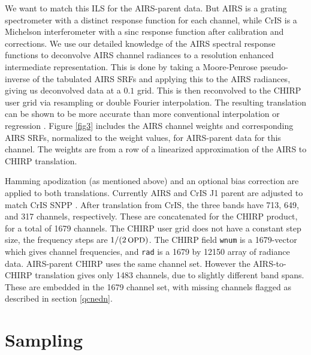 \documentclass[11pt]{article}
\begin{document}
We want to match this ILS for the AIRS-parent data.  But AIRS is a
grating spectrometer with a distinct response function for each
channel, while CrIS is a Michelson interferometer with a sinc
response function after calibration and corrections.  We use our
detailed knowledge of the AIRS spectral response functions to
deconvolve AIRS channel radiances to a resolution enhanced
intermediate representation.  This is done by taking a Moore-Penrose
pseudo-inverse of the tabulated AIRS SRFs and applying this to the
AIRS radiances, giving us deconvolved data at a $0.1$ {\wn} grid.
This is then reconvolved to the CHIRP user grid via resampling or
double Fourier interpolation.  The resulting translation can be
shown to be more accurate than more conventional interpolation or
regression \cite{mott2018}.  Figure \ref{fig3} includes the AIRS
channel weights and corresponding AIRS SRFs, normalized to the weight
values, for AIRS-parent data for this channel.  The weights are from
a row of a linearized approximation of the AIRS to CHIRP translation.

Hamming apodization (as mentioned above) and an optional bias
correction are applied to both translations.  Currently AIRS and
CrIS J1 parent are adjusted to match CrIS SNPP \cite{strow2021a}.
After translation from CrIS, the three bands have 713, 649, and 317
channels, respectively.  These are concatenated for the CHIRP
product, for a total of 1679 channels.  The CHIRP user grid does not
have a constant step size, the frequency steps are $1/(2 \,\mbox{\small OPD})$.
The CHIRP field \texttt{wnum} is a 1679-vector which gives channel
frequencies, and \texttt{rad} is a 1679 by 12150 array of radiance
data.  AIRS-parent CHIRP uses the same channel set.  However the
AIRS-to-CHIRP translation gives only 1483 channels, due to slightly
different band spans.  These are embedded in the 1679 channel set,
with missing channels flagged as described in section \ref{qcnedn}.

\section{Sampling}
\label{sampling}
\end{document}

